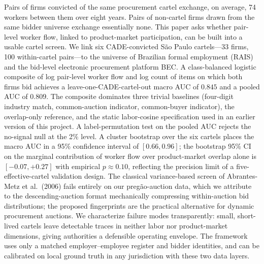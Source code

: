 Pairs of firms convicted of the same procurement cartel exchange, on average, 74 workers between them over eight years. Pairs of non-cartel firms drawn from the same bidder universe exchange essentially none. This paper asks whether pair-level worker flow, linked to product-market participation, can be built into a usable cartel screen. We link six CADE-convicted S\~{a}o Paulo cartels---33 firms, 100 within-cartel pairs---to the universe of Brazilian formal employment (RAIS) and the bid-level electronic procurement platform BEC. A class-balanced logistic composite of log pair-level worker flow and log count of items on which both firms bid achieves a leave-one-CADE-cartel-out macro AUC of $0.845$ and a pooled AUC of $0.809$. The composite dominates three trivial baselines (four-digit industry match, common-auction indicator, common-buyer indicator), the overlap-only reference, and the static labor-cosine specification used in an earlier version of this project. A label-permutation test on the pooled AUC rejects the no-signal null at the 2\% level. A cluster bootstrap over the six cartels places the macro AUC in a 95\% confidence interval of $[0.66, 0.96]$; the bootstrap 95\% CI on the marginal contribution of worker flow over product-market overlap alone is $[-0.07, +0.27]$ with empirical $p \approx 0.10$, reflecting the precision limit of a five-effective-cartel validation design. The classical variance-based screen of Abrantes-Metz et al.\ (2006) fails entirely on our preg\~{a}o-auction data, which we attribute to the descending-auction format mechanically compressing within-auction bid distributions; the proposed fingerprints are the practical alternative for dynamic procurement auctions. We characterize failure modes transparently: small, short-lived cartels leave detectable traces in neither labor nor product-market dimensions, giving authorities a defensible operating envelope. The framework uses only a matched employer--employee register and bidder identities, and can be calibrated on local ground truth in any jurisdiction with these two data layers.
